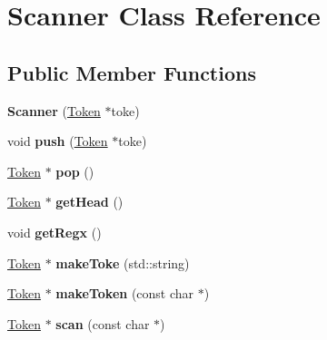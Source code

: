 \hypertarget{classScanner}{\section{Scanner Class Reference}
\label{classScanner}
}
\subsection*{Public Member Functions}
\begin{DoxyCompactItemize}
\item 
\hypertarget{classScanner_a289dc1f278cdea9c7f290ad46cf85bd2}{{\bfseries Scanner} (\hyperlink{classToken}{Token} $\ast$toke)}\label{classScanner_a289dc1f278cdea9c7f290ad46cf85bd2}

\item 
\hypertarget{classScanner_a186ae0ef8cd6cd6ef6c78d670c1fabaf}{void {\bfseries push} (\hyperlink{classToken}{Token} $\ast$toke)}\label{classScanner_a186ae0ef8cd6cd6ef6c78d670c1fabaf}

\item 
\hypertarget{classScanner_ab2957742ec855cce79d1fadc4eafc8c0}{\hyperlink{classToken}{Token} $\ast$ {\bfseries pop} ()}\label{classScanner_ab2957742ec855cce79d1fadc4eafc8c0}

\item 
\hypertarget{classScanner_aa73c3f66ddedf18b0b6f096bffaabbfa}{\hyperlink{classToken}{Token} $\ast$ {\bfseries get\-Head} ()}\label{classScanner_aa73c3f66ddedf18b0b6f096bffaabbfa}

\item 
\hypertarget{classScanner_ad991d05bd22fbf1d8eb670bb69eb0460}{void {\bfseries get\-Regx} ()}\label{classScanner_ad991d05bd22fbf1d8eb670bb69eb0460}

\item 
\hypertarget{classScanner_a85e45b51ff72e5515e53609e06d579ca}{\hyperlink{classToken}{Token} $\ast$ {\bfseries make\-Toke} (std\-::string)}\label{classScanner_a85e45b51ff72e5515e53609e06d579ca}

\item 
\hypertarget{classScanner_ad9c3562dc3be00426f9254846605ebda}{\hyperlink{classToken}{Token} $\ast$ {\bfseries make\-Token} (const char $\ast$)}\label{classScanner_ad9c3562dc3be00426f9254846605ebda}

\item 
\hypertarget{classScanner_a4cf90c9e68bfb17f23af7368ff15766e}{\hyperlink{classToken}{Token} $\ast$ {\bfseries scan} (const char $\ast$)}\label{classScanner_a4cf90c9e68bfb17f23af7368ff15766e}

\end{DoxyCompactItemize}
